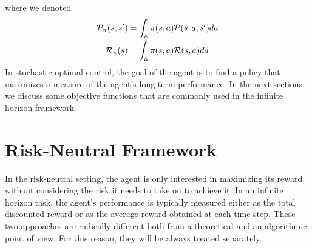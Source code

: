 where we denoted 
\begin{equation*}
	\begin{split}
		\mathcal{P}_\pi(s, s') &= \int_{\mathbb{A}} \pi(s, a) \mathcal{P}(s, a, s') da\\
		\mathcal{R}_\pi(s) &= \int_{\mathbb{A}} \pi(s, a) \mathcal{R}(s, a) da\\
	\end{split}
\end{equation*}
In stochastic optimal control, the goal of the agent is to find a policy that
maximizes a measure of the agent's long-term performance. In the next sections
we discuss some objective functions that are commonly used in the infinite
horizon framework. 

\section{Risk-Neutral Framework}
In the risk-neutral setting, the agent is only interested in maximizing its reward, without considering the risk it needs to take on to achieve it. In an infinite horizon task, the agent's performance is typically measured either as the total discounted reward or as the average reward obtained at each time step. These two approaches are radically different both from a theoretical and an algorithmic point of view. For this reason, they will be always treated separately.  

